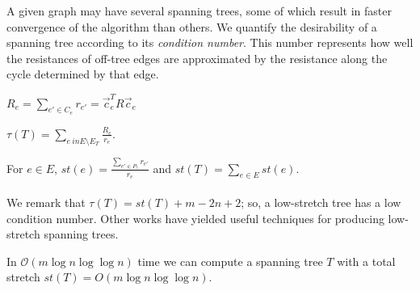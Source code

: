 A given graph may have several spanning trees, some of which result in faster convergence of the algorithm than others. We quantify the desirability of a spanning tree according to its \textit{condition number}. This number represents how well the resistances of off-tree edges are approximated by the resistance along the cycle determined by that edge. 
\begin{definition}$R_e = \sum_{e' \in C_e} r_{e'} = \vec c_e^T R \vec c_e$
\end{definition}
\begin{definition}
    $\tau(T) = \sum_{e\ in E \setminus E_T} \frac{R_e}{r_e}$. 
\end{definition}
\begin{definition}[Stretch $st$] For $e \in E$, $st(e) = \frac{\sum_{e' \in P_e} r_{e'}}{r_e}$ and $st(T) = \sum_{e \in E} st(e)$.
\\
\\
We remark that $\tau(T) =  st(T) + m - 2n + 2 $; so, a low-stretch tree has a low condition number. Other works have yielded useful techniques for producing low-stretch spanning trees. 

\begin{theorem}[\cite{AN12}] 
\label{thm:AN12}
    In $\mathcal O(m \log n \log \log n)$ time we can compute a spanning tree $T$ with a total stretch $st(T) = O(m \log n \log \log n)$. 
\end{theorem}
    
\end{definition}



